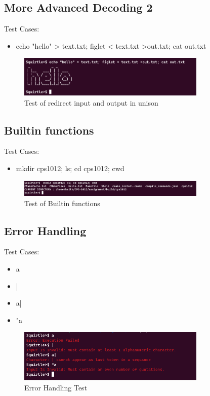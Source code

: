 \documentclass[12pt, a4paper]{report}
\begin{document}
\subsection{More Advanced Decoding 2}
Test Cases:
\begin{itemize}
  \item echo "hello" > text.txt; figlet < text.txt >out.txt; cat out.txt 
\end{itemize}
\begin{figure}[!htp]
    \centering
    \includegraphics[width=9cm]
    {Diagrams/Shell_Test_5}
    \caption{Test of redirect input and output in unison}
\end{figure}

\subsection{Builtin functions}
Test Cases:
\begin{itemize}
  \item mkdir cps1012; ls; cd cps1012; cwd
\end{itemize}
\begin{figure}[!htp]
    \centering
    \includegraphics[width=9cm]
    {Diagrams/Shell_Test_3}
    \caption{Test of Builtin functions}
\end{figure}

\subsection{Error Handling}
Test Cases:
\begin{itemize}
  \item a
  \item |
  \item a|
  \item "a
\end{itemize}
\begin{figure}[!htp]
    \centering
    \includegraphics[width=9cm]
    {Diagrams/Shell_Test_4}
    \caption{Error Handling Test}
\end{figure}
\end{document}
